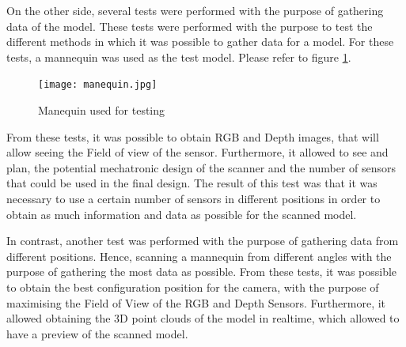 \documentclass[12pt]{report}
\begin{document}
On the other side, several tests were performed with the purpose of gathering data of the model. These tests were performed with the purpose to test the different methods in which it was possible to gather data for a model.
For these tests, a mannequin was used as the test model. Please refer to figure \ref{fig:mane}.

\begin{figure}[ht]
  \centering
  \texttt{[image: manequin.jpg]}
  \caption{Manequin used for testing}
  \label{fig:mane}
\end{figure}


From these tests, it was possible to obtain RGB and Depth images, that will allow seeing the Field of view of the sensor. Furthermore, it allowed to see and plan, the potential mechatronic design of the scanner and the number of sensors that could be used in the final design.
The result of this test was that it was necessary to use a certain number of sensors in different positions in order to obtain as much information and data as possible for the scanned model. 

In contrast, another test was performed with the purpose of gathering data from different positions. Hence, scanning a mannequin from different angles with the purpose of gathering the most data as possible. 
From these tests, it was possible to obtain the best configuration position for the camera, with the purpose of maximising the Field of View of the RGB and Depth Sensors.
Furthermore, it allowed obtaining the 3D point clouds of the model in realtime, which allowed to have a preview of the scanned model.  
\end{document}
